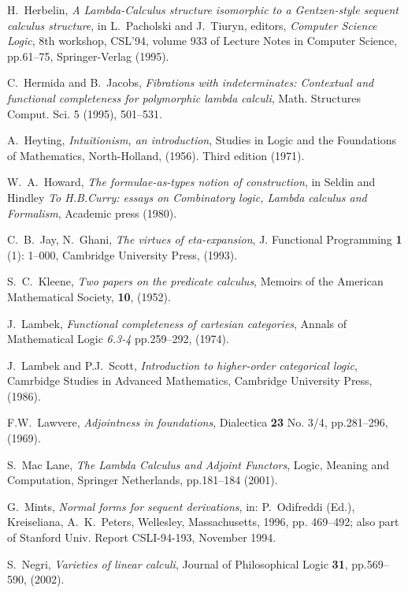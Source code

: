 \documentclass[english,letter paper,12pt,leqno]{article}
\theoremstyle{example}
\numberwithin{equation}{section}
\begin{document}
\begin{thebibliography}{BHLS03}
	H.~Herbelin, \textsl{A Lambda-Calculus structure isomorphic to a Gentzen-style sequent calculus structure}, in L.~Pacholski and J.~Tiuryn, editors, \textsl{Computer Science Logic}, 8th workshop, CSL'94, volume 933 of Lecture Notes in Computer Science, pp.61--75, Springer-Verlag (1995).
	
	C.~Hermida and B.~Jacobs, \textsl{Fibrations with indeterminates: Contextual and functional completeness for polymorphic lambda calculi}, Math. Structures Comput. Sci. 5 (1995), 501--531.
	
	A.~Heyting, \textsl{Intuitionism, an introduction}, Studies in Logic and the Foundations of Mathematics, North-Holland, (1956). Third edition (1971).
	
	W.~A.~Howard, \textsl{The formulae-as-types notion of construction}, in Seldin and Hindley \textsl{To H.B.Curry: essays on Combinatory logic, Lambda calculus and Formalism}, Academic press (1980).
	
	C.~B.~Jay, N.~Ghani, \textsl{The virtues of eta-expansion}, J. Functional Programming \textbf{1} (1): 1--000, Cambridge University Press, (1993).
	
	S.~C.~Kleene, \textsl{Two papers on the predicate calculus}, Memoirs of the American Mathematical Society, \textbf{10}, (1952).
	
	 J.~Lambek, \textsl{Functional completeness of cartesian categories}, Annals of Mathematical Logic \emph{6.3-4} pp.259--292, (1974).
	
	J.~Lambek and P.J.~Scott, \textsl{Introduction to higher-order categorical logic}, Camrbidge Studies in Advanced Mathematics, Cambridge University Press, (1986).
	
	F.W.~Lawvere, \textsl{Adjointness in foundations}, Dialectica \textbf{23} No. 3/4, pp.281--296, (1969).
	
	S.~Mac Lane, \textsl{The Lambda Calculus and Adjoint Functors}, Logic, Meaning and Computation, Springer Netherlands, pp.181--184 (2001).
	
	G.~Mints, \textsl{Normal forms for sequent derivations}, in: P.~Odifreddi (Ed.), Kreiseliana, A.~K.~Peters, Wellesley, Massachusetts, 1996, pp. 469--492; also part of Stanford Univ. Report CSLI-94-193, November 1994.
	
	S.~Negri, \textsl{Varieties of linear calculi}, Journal of Philosophical Logic \textbf{31}, pp.569--590, (2002).
	

\end{thebibliography}
\end{document}
